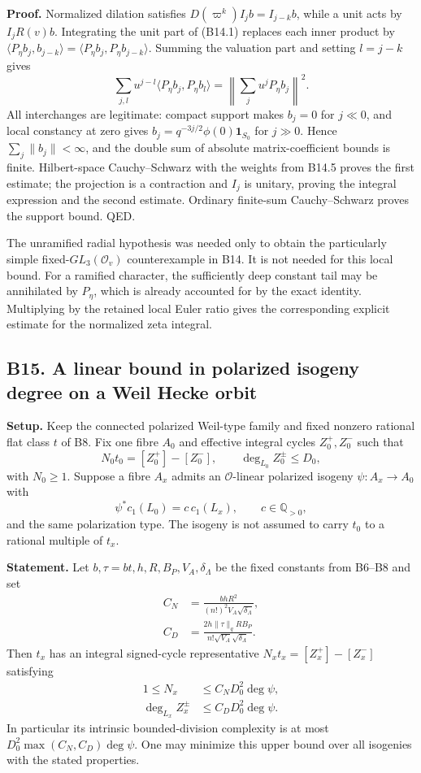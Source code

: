 \textbf{Proof.} Normalized dilation satisfies \(D(\varpi^k)I_jb=I_{j-k}b\), while a unit acts by \(I_jR(v)b\). Integrating the unit part of (B14.1) replaces each inner product by \(\langle P_\eta b_j,b_{j-k}\rangle=\langle P_\eta b_j,P_\eta b_{j-k}\rangle\). Summing the valuation part and setting \(l=j-k\) gives \[
 \sum_{j,l}u^{j-l}\langle P_\eta b_j,P_\eta b_l\rangle
 =\left\|\sum_j u^jP_\eta b_j\right\|^2.
\] All interchanges are legitimate: compact support makes \(b_j=0\) for \(j\ll0\), and local constancy at zero gives \(b_j=q^{-3j/2}\phi(0)\mathbf1_{S_0}\) for \(j\gg0\). Hence \(\sum_j\|b_j\|<\infty\), and the double sum of absolute matrix-coefficient bounds is finite. Hilbert-space Cauchy--Schwarz with the weights from B14.5 proves the first estimate; the projection is a contraction and \(I_j\) is unitary, proving the integral expression and the second estimate. Ordinary finite-sum Cauchy--Schwarz proves the support bound. QED.

The unramified radial hypothesis was needed only to obtain the particularly simple fixed-\(GL_3(\mathcal O_v)\) counterexample in B14. It is not needed for this local bound. For a ramified character, the sufficiently deep constant tail may be annihilated by \(P_\eta\), which is already accounted for by the exact identity. Multiplying by the retained local Euler ratio gives the corresponding explicit estimate for the normalized zeta integral.

\subsection{B15. A linear bound in polarized isogeny degree on a Weil Hecke orbit}\label{b15.-a-linear-bound-in-polarized-isogeny-degree-on-a-weil-hecke-orbit}

\textbf{Setup.} Keep the connected polarized Weil-type family and fixed nonzero rational flat class \(t\) of B8. Fix one fibre \(A_0\) and effective integral cycles \(Z_0^+,Z_0^-\) such that \[
 N_0t_0=[Z_0^+]-[Z_0^-],\qquad
 \deg_{L_0}Z_0^\pm\le D_0,
\] with \(N_0\ge1\). Suppose a fibre \(A_x\) admits an \(\mathcal O\)-linear polarized isogeny \(\psi:A_x\to A_0\) with \[
 \psi^*c_1(L_0)=c\,c_1(L_x),\qquad c\in\mathbb Q_{>0},
\] and the same polarization type. The isogeny is not assumed to carry \(t_0\) to a rational multiple of \(t_x\).

\textbf{Statement.} Let \(b,\tau=bt,h,R,B_P,V_A,\delta_\Lambda\) be the fixed constants from B6--B8 and set \[
 \begin{aligned}
 C_N&=\frac{b h R^2}{(n!)^2 V_A\sqrt{\delta_\Lambda}},\\
 C_D&=\frac{2h\|\tau\|_q R B_P}{n!\sqrt{V_A}\sqrt{\delta_\Lambda}}.
 \end{aligned}
\] Then \(t_x\) has an integral signed-cycle representative \(N_xt_x=[Z_x^+]-[Z_x^-]\) satisfying \[
 \begin{aligned}
 1\le N_x&\le C_N D_0^2\deg\psi,\\
 \deg_{L_x} Z_x^\pm&\le C_D D_0^2\deg\psi.
 \end{aligned}
\tag{B15.1}
\] In particular its intrinsic bounded-division complexity is at most \(D_0^2\max(C_N,C_D)\deg\psi\). One may minimize this upper bound over all isogenies with the stated properties.


